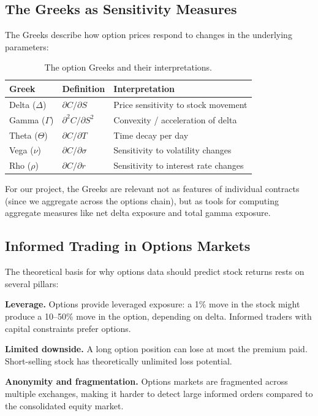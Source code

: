 \documentclass[11pt,a4paper]{article}
\begin{document}
\subsection{The Greeks as Sensitivity Measures}

The Greeks describe how option prices respond to changes in the underlying parameters:

\begin{table}[H]
\centering
\begin{tabular}{@{}lll@{}}
\toprule
\textbf{Greek} & \textbf{Definition} & \textbf{Interpretation} \\
\midrule
Delta ($\Delta$) & $\partial C / \partial S$ & Price sensitivity to stock movement \\
Gamma ($\Gamma$) & $\partial^2 C / \partial S^2$ & Convexity / acceleration of delta \\
Theta ($\Theta$) & $\partial C / \partial T$ & Time decay per day \\
Vega ($\nu$) & $\partial C / \partial \sigma$ & Sensitivity to volatility changes \\
Rho ($\rho$) & $\partial C / \partial r$ & Sensitivity to interest rate changes \\
\bottomrule
\end{tabular}
\caption{The option Greeks and their interpretations.}
\end{table}

For our project, the Greeks are relevant not as features of individual contracts (since we aggregate across the options chain), but as tools for computing aggregate measures like net delta exposure and total gamma exposure.

\subsection{Informed Trading in Options Markets}

The theoretical basis for why options data should predict stock returns rests on several pillars:

\textbf{Leverage.} Options provide leveraged exposure: a 1\% move in the stock might produce a 10--50\% move in the option, depending on delta. Informed traders with capital constraints prefer options.

\textbf{Limited downside.} A long option position can lose at most the premium paid. Short-selling stock has theoretically unlimited loss potential.

\textbf{Anonymity and fragmentation.} Options markets are fragmented across multiple exchanges, making it harder to detect large informed orders compared to the consolidated equity market.
\end{document}
